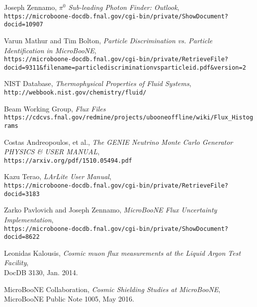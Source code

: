 \documentclass{article}
\begin{document}
\begin{thebibliography}{9}
  Joseph Zennamo, \emph{$\pi^0$ Sub-leading Photon Finder: Outlook},\\
  \texttt{https://microboone-docdb.fnal.gov/cgi-bin/private/ShowDocument?docid=10907}
 
  
  Varun Mathur and Tim Bolton, \emph{Particle Discrimination vs. Particle Identification in MicroBooNE},\\
  \texttt{https://microboone-docdb.fnal.gov/cgi-bin/private/RetrieveFile?docid=9311\&filename=particlediscriminationvsparticleid.pdf\&version=2}

 NIST Database, \emph{Thermophysical Properties of Fluid Systems},\\
  \texttt{http://webbook.nist.gov/chemistry/fluid/}

  Beam Working Group, \emph{Flux Files}\\
  \texttt{https://cdcvs.fnal.gov/redmine/projects/ubooneoffline/wiki/Flux\_Histograms}

  Costas Andreopoulos, et al., \emph{The GENIE Neutrino Monte Carlo Generator PHYSICS \& USER MANUAL},\\
  \texttt{https://arxiv.org/pdf/1510.05494.pdf}

  Kazu Terao, \emph{LArLite User Manual},\\
  \texttt{https://microboone-docdb.fnal.gov/cgi-bin/private/RetrieveFile?docid=3183}

  Zarko Pavlovich and Joseph Zennamo, \emph{MicroBooNE Flux Uncertainty Implementation},\\
  \texttt{https://microboone-docdb.fnal.gov/cgi-bin/private/ShowDocument?docid=8622}

Leonidas Kalousis, \emph{Cosmic muon flux measurements at the Liquid Argon Test Facility}, \\DocDB 3130, Jan. 2014. 

MicroBooNE Collaboration, \emph{Cosmic Shielding Studies at MicroBooNE}, \\ MicroBooNE Public Note 1005, May 2016.





\end{thebibliography}
\end{document}
